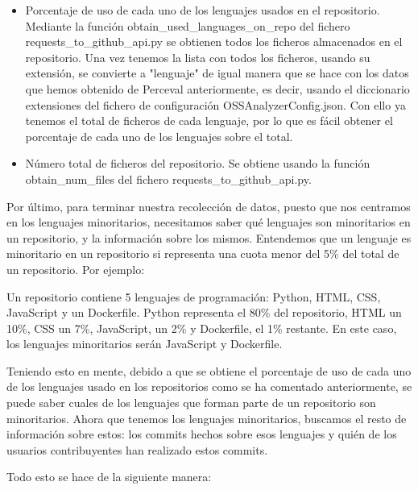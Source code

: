 \documentclass[a4paper, 12pt]{book}
\begin{document}
\begin{itemize}
  \item Porcentaje de uso de cada uno de los lenguajes usados en el repositorio. Mediante la función obtain\_used\_languages\_on\_repo del fichero requests\_to\_github\_api.py se obtienen todos los ficheros almacenados en el repositorio. Una vez tenemos la lista con todos los ficheros, usando su extensión, se convierte a "lenguaje" de igual manera que se hace con los datos que hemos obtenido de Perceval anteriormente, es decir, usando el diccionario extensiones del fichero de configuración OSSAnalyzerConfig.json. Con ello ya tenemos el total de ficheros de cada lenguaje, por lo que es fácil obtener el porcentaje de cada uno de los lenguajes sobre el total.
  \item Número total de ficheros del repositorio. Se obtiene usando la función obtain\_num\_files del fichero requests\_to\_github\_api.py.
\end{itemize}

Por último, para terminar nuestra recolección de datos, puesto que nos centramos en los lenguajes minoritarios, necesitamos saber qué lenguajes son minoritarios en un repositorio, y la información sobre los mismos. Entendemos que un lenguaje es minoritario en un repositorio si representa una cuota menor del 5\% del total de un repositorio. Por ejemplo:

Un repositorio contiene 5 lenguajes de programación: Python, HTML, CSS, JavaScript y un Dockerfile. Python representa el 80\% del repositorio, HTML un 10\%, CSS un 7\%, JavaScript, un 2\% y Dockerfile, el 1\% restante. En este caso, los lenguajes minoritarios serán JavaScript y Dockerfile.

Teniendo esto en mente, debido a que se obtiene el porcentaje de uso de cada uno de los lenguajes usado en los repositorios como se ha comentado anteriormente, se puede saber cuales de los lenguajes que forman parte de un repositorio son minoritarios. Ahora que tenemos los lenguajes minoritarios, buscamos el resto de información sobre estos: los commits hechos sobre esos lenguajes y quién de los usuarios contribuyentes han realizado estos commits.

Todo esto se hace de la siguiente manera:
\end{document}
